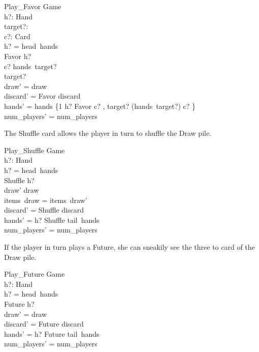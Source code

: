 \documentclass[11pt, fuzz]{article}
\begin{document}
\begin{schema}{Play\_Favor}
    \Delta Game \\
    h?: Hand \\
    target?: \nat \\
    c?: Card \\
\where
    h? = head~hands \\
    Favor \inbag h? \\
    c? \inbag hands~target? \\
    target?  \\
    draw' = draw \\
    discard' = \langle Favor \rangle \cat discard \\
    hands' = hands \oplus \{1 \mapsto h? \uminus \lbag Favor \rbag \uplus \lbag c? \rbag, target? \mapsto (hands~target?) \uminus \lbag c? \rbag\} \\
    num\_players' = num\_players 
\end{schema}

The Shuffle card allows the player in turn to shuffle the Draw pile. 

\begin{schema}{Play\_Shuffle}
    \Delta Game \\
    h?: Hand \\
\where
    h? = head~hands \\
    Shuffle \inbag h? \\
    draw' \neq draw \\
    items~draw = items~draw' \\
    discard' = \langle Shuffle \rangle \cat discard \\
    hands' = \langle h? \uminus \lbag Shuffle \rbag \rangle \cat tail~hands \\
    num\_players' = num\_players
\end{schema}

If the player in turn plays a Future, she can sneakily see the three to card of the Draw pile. 

\begin{schema}{Play\_Future}
    \Delta Game \\
    h?: Hand \\
\where
    h? = head~hands \\
    Future \inbag h? \\
    draw' = draw \\
    discard' = \langle Future \rangle \cat discard \\
    hands' = \langle h? \uminus \lbag Future \rbag \rangle \cat tail~hands \\
    num\_players' = num\_players
\end{schema}
\end{document}
